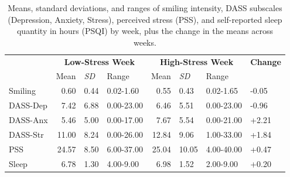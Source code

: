 \documentclass[authordate, empirical]{jote-new-article}
\begin{document}
\begin{table}[b]
  \begin{fullwidth}
    \caption{Means, standard deviations, and ranges of smiling intensity, DASS subscales (Depression, Anxiety, Stress), perceived stress (PSS), and self-reported sleep quantity in hours (PSQI) by week, plus the change in the means across weeks.}
    \begin{tabularx}{\linewidth}{@{} X r l l r l l l @{}}
      \toprule
               & \multicolumn{3}{c}{\textbf{Low-Stress Week}} & \multicolumn{3}{c}{\textbf{High-Stress Week}}
               & \textbf{Change}                                                                                                                                      \\


               & Mean                                         & \textit{SD}                                   & Range      & Mean  & \textit{SD} & Range      &       \\
      \midrule

      Smiling  & 0.60                                         & 0.44                                          & 0.02-1.60  & 0.55  & 0.43        & 0.02-1.65  & -0.05 \\

      DASS-Dep & 7.42                                         & 6.88                                          & 0.00-23.00 & 6.46  & 5.51        & 0.00-23.00 & -0.96 \\

      DASS-Anx & 5.46                                         & 5.00                                          & 0.00-17.00 & 7.67  & 5.54        & 0.00-21.00 & +2.21 \\

      DASS-Str & 11.00                                        & 8.24                                          & 0.00-26.00 & 12.84 & 9.06        & 1.00-33.00 & +1.84
      \\

      PSS      & 24.57                                        & 8.50                                          & 6.00-37.00 & 25.04 & 10.05       & 4.00-40.00 & +0.47 \\

      Sleep    & 6.78                                         & 1.30                                          & 4.00-9.00  & 6.98  & 1.52        & 2.00-9.00  & +0.20 \\
      \bottomrule
    \end{tabularx}
  \end{fullwidth}
\end{table}
\end{document}
